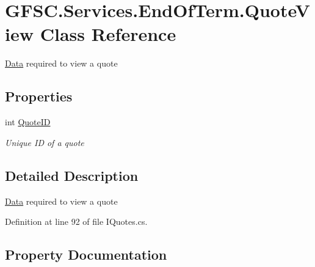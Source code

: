 \hypertarget{class_g_f_s_c_1_1_services_1_1_end_of_term_1_1_quote_view}{}\section{G\+F\+S\+C.\+Services.\+End\+Of\+Term.\+Quote\+View Class Reference}
\label{class_g_f_s_c_1_1_services_1_1_end_of_term_1_1_quote_view}


\mbox{\hyperlink{namespace_g_f_s_c_1_1_services_1_1_end_of_term_1_1_data}{Data}} required to view a quote  


\subsection*{Properties}
\begin{DoxyCompactItemize}
\item 
int \mbox{\hyperlink{class_g_f_s_c_1_1_services_1_1_end_of_term_1_1_quote_view_a503c1a59047c6c0e4ae7bd086fdcc631}{Quote\+ID}}
\begin{DoxyCompactList}\small\item\em Unique ID of a quote \end{DoxyCompactList}\end{DoxyCompactItemize}


\subsection{Detailed Description}
\mbox{\hyperlink{namespace_g_f_s_c_1_1_services_1_1_end_of_term_1_1_data}{Data}} required to view a quote 



Definition at line 92 of file I\+Quotes.\+cs.



\subsection{Property Documentation}
\mbox{\label{class_g_f_s_c_1_1_services_1_1_end_of_term_1_1_quote_view_a503c1a59047c6c0e4ae7bd086fdcc631}} 
